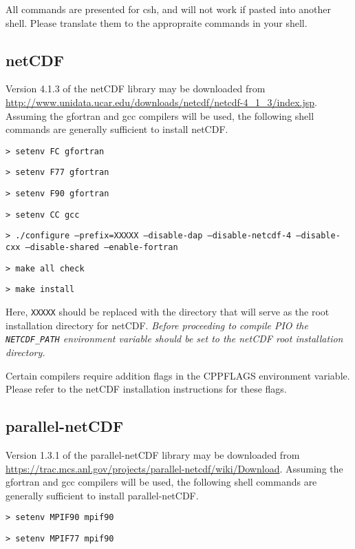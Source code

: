 All commands are presented for csh, and will not work if pasted into another shell. Please translate them to the appropraite commands in your shell.

\subsection{netCDF}

Version 4.1.3 of the netCDF library may be downloaded from \url{http://www.unidata.ucar.edu/downloads/netcdf/netcdf-4\_1\_3/index.jsp}.
Assuming the gfortran and gcc compilers will be used, the following shell commands are generally sufficient to install netCDF.

\vspace{12pt}
{\tt > setenv FC gfortran}

{\tt > setenv F77 gfortran} 

{\tt > setenv F90 gfortran}

{\tt > setenv CC gcc} 

{\tt > ./configure --prefix=XXXXX --disable-dap --disable-netcdf-4 --disable-cxx \hfill\break --disable-shared --enable-fortran} 

{\tt > make all check}

{\tt > make install}
\vspace{12pt}

Here, {\tt XXXXX} should be replaced with the directory that will serve as the root installation directory for netCDF.
{\em Before proceeding to compile PIO the {\tt NETCDF\_PATH} environment variable should be set to the netCDF root installation directory.}

Certain compilers require addition flags in the CPPFLAGS environment variable. Please refer to the netCDF installation instructions for these flags.

\subsection{parallel-netCDF}

Version 1.3.1 of the parallel-netCDF library may be downloaded from \url{https://trac.mcs.anl.gov/projects/parallel-netcdf/wiki/Download}.
Assuming the gfortran and gcc compilers will be used, the following shell commands are generally sufficient to install parallel-netCDF.

\vspace{12pt}
{\tt > setenv MPIF90 mpif90}

{\tt > setenv MPIF77 mpif90} 

